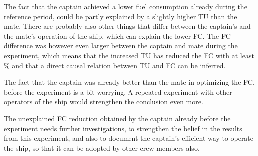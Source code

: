 The fact that the captain achieved a lower fuel consumption already during the reference period, could be partly explained by a slightly higher TU than the mate. There are probably also other things that differ between the captain's and the mate's operation of the ship, which can explain the lower FC. The FC difference was however even larger between the captain and mate during the experiment, which means that the increased TU has reduced the FC with at least \savingthrusterallocationpct \% and that a direct causal relation between TU and FC can be inferred.

The fact that the captain was already better than the mate in optimizing the FC, before the experiment is a bit worrying. A repeated experiment with other operators of the ship would strengthen the conclusion even more.

The unexplained FC reduction obtained by the captain already before the experiment needs further investigations, to strengthen the belief in the results from this experiment, and also to document the captain's efficient way to operate the ship, so that it can be adopted by other crew members also. 